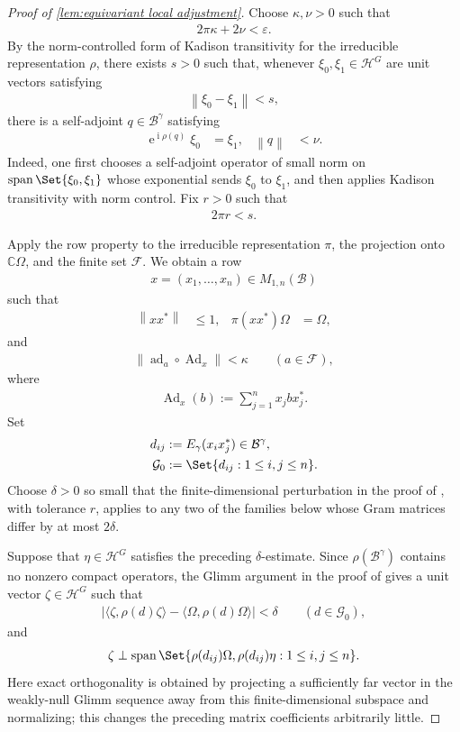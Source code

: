 \documentclass[a4paper,10pt]{article}
\numberwithin{equation}{section}
\theoremstyle{plain}
\theoremstyle{plain}
\theoremstyle{plain}
\theoremstyle{plain}
\theoremstyle{plain}
\theoremstyle{remark}
\theoremstyle{definition}
\newcommand{\ee}{\operatorname{e}}
\newcommand{\ii}{\operatorname{i}}
\newcommand{\CC}{\mathbb{C}}
\newcommand{\calB}{\mathcal{B}}
\newcommand{\calF}{\mathcal{F}}
\newcommand{\calG}{\mathcal{G}}
\newcommand{\calH}{\mathcal{H}}
\newcommand\norm[1]{\left\lVert#1\right\rVert}
\newcommand{\ip}[2]{\langle #1, #2 \rangle}
\newcommand{\eq}[1]{\begin{align*}#1\end{align*}}
\begin{document}
\begin{proof}[Proof of \cref{lem:equivariant local adjustment}]
Choose \(\kappa,\nu>0\) such that
\eq{
    2\pi\kappa+2\nu
    <
    \varepsilon.
}
By the norm-controlled form of Kadison transitivity
\cite[Theorem~3.4]{SpiegelEtAl2022Kadison} for the irreducible
representation \(\rho\), there exists \(s>0\) such that, whenever
\(\xi_0,\xi_1\in\calH^G\) are unit vectors satisfying
\eq{
    \norm{\xi_0-\xi_1}
    <
    s,
}
there is a self-adjoint \(q\in\calB^\gamma\) satisfying
\eq{
    \ee^{\ii\rho(q)}\xi_0
    &=
    \xi_1,&
    \norm{q}
    &<
    \nu.
}
Indeed, one first chooses a self-adjoint operator of small norm on
\(\operatorname{span}\Set{\xi_0,\xi_1}\) whose exponential sends
\(\xi_0\) to \(\xi_1\), and then applies Kadison transitivity with
norm control. Fix \(r>0\) such that
\eq{
    2\pi r
    <
    s.
}

Apply the row property
\cite[Property~1.3 and Section~4]{KishimotoOzawaSakai2003Homogeneity}
to the irreducible representation \(\pi\), the projection onto
\(\CC\Omega\), and the finite set \(\calF\). We obtain a row
\eq{
    x
    =
    (x_1,\ldots,x_n)
    \in
    M_{1,n}(\calB)
}
such that
\eq{
    \norm{xx^*}
    &\leq
    1,&
    \pi(xx^*)\Omega
    &=
    \Omega,
}
and
\eq{
    \norm{
        \operatorname{ad}_a
        \circ
        \operatorname{Ad}_x
    }
    <
    \kappa
    \qquad
    (a\in\calF),
}
where
\eq{
    \operatorname{Ad}_x(b)
    :=
    \sum_{j=1}^n
    x_jbx_j^*.
}
Set
\eq{
    d_{ij}
    &:=
    E_\gamma(x_ix_j^*)
    \in
    \calB^\gamma,\\
    \calG_0
    &:=
    \Set{
        d_{ij}:
        1\leq i,j\leq n
    }.
}
Choose \(\delta>0\) so small that the finite-dimensional perturbation
in the proof of
\cite[Theorem~3.1]{KishimotoOzawaSakai2003Homogeneity}, with tolerance
\(r\), applies to any two of the families below whose Gram matrices
differ by at most \(2\delta\).

Suppose that \(\eta\in\calH^G\) satisfies the preceding
\(\delta\)-estimate. Since \(\rho(\calB^\gamma)\) contains no nonzero
compact operators, the Glimm argument in the proof of
\cite[Theorem~3.1]{KishimotoOzawaSakai2003Homogeneity} gives a unit
vector \(\zeta\in\calH^G\) such that
\eq{
    \left|
        \ip{\zeta}{\rho(d)\zeta}
        -
        \ip{\Omega}{\rho(d)\Omega}
    \right|
    <
    \delta
    \qquad
    (d\in\calG_0),
}
and
\eq{
    \zeta
    \perp
    \operatorname{span}
    \Set{
        \rho(d_{ij})\Omega,
        \rho(d_{ij})\eta:
        1\leq i,j\leq n
    }.
}
Here exact orthogonality is obtained by projecting a sufficiently far
vector in the weakly-null Glimm sequence away from this
finite-dimensional subspace and normalizing; this changes the
preceding matrix coefficients arbitrarily little.


\end{proof}
\end{document}
